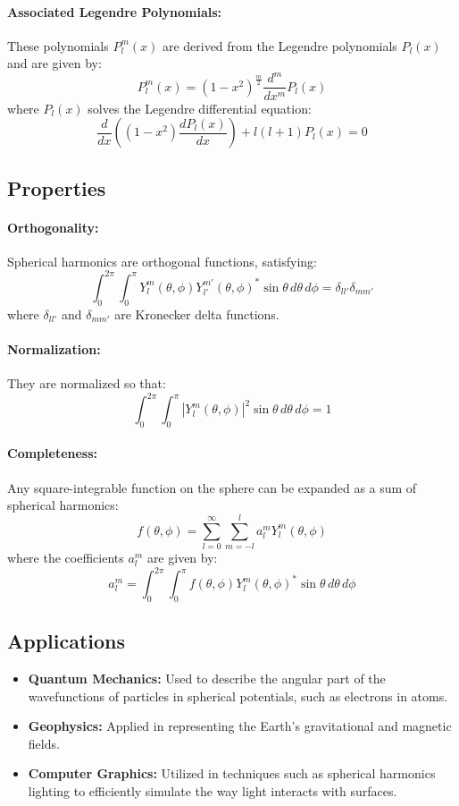 \paragraph{Associated Legendre Polynomials:}
These polynomials \( P_l^m(x) \) are derived from the Legendre polynomials \( P_l(x) \) and are given by:
\[
P_l^m(x) = (1 - x^2)^{\frac{m}{2}} \frac{d^m}{dx^m} P_l(x)
\]
where \( P_l(x) \) solves the Legendre differential equation:
\[
\frac{d}{dx} \left( (1 - x^2) \frac{d P_l(x)}{dx} \right) + l(l+1) P_l(x) = 0
\]

\subsection*{Properties}

\paragraph{Orthogonality:}
Spherical harmonics are orthogonal functions, satisfying:
\[
\int_0^{2\pi} \int_0^{\pi} Y_l^m(\theta, \phi) Y_{l'}^{m'}(\theta, \phi)^* \sin \theta \, d\theta \, d\phi = \delta_{ll'} \delta_{mm'}
\]
where \( \delta_{ll'} \) and \( \delta_{mm'} \) are Kronecker delta functions.

\paragraph{Normalization:}
They are normalized so that:
\[
\int_0^{2\pi} \int_0^{\pi} |Y_l^m(\theta, \phi)|^2 \sin \theta \, d\theta \, d\phi = 1
\]

\paragraph{Completeness:}
Any square-integrable function on the sphere can be expanded as a sum of spherical harmonics:
\[
f(\theta, \phi) = \sum_{l=0}^{\infty} \sum_{m=-l}^{l} a_l^m Y_l^m(\theta, \phi)
\]
where the coefficients \( a_l^m \) are given by:
\[
a_l^m = \int_0^{2\pi} \int_0^{\pi} f(\theta, \phi) Y_l^m(\theta, \phi)^* \sin \theta \, d\theta \, d\phi
\]

\subsection*{Applications}

\begin{itemize}
	\item \textbf{Quantum Mechanics:} Used to describe the angular part of the wavefunctions of particles in spherical potentials, such as electrons in atoms.
	\item \textbf{Geophysics:} Applied in representing the Earth's gravitational and magnetic fields.
	\item \textbf{Computer Graphics:} Utilized in techniques such as spherical harmonics lighting to efficiently simulate the way light interacts with surfaces.
\end{itemize}

